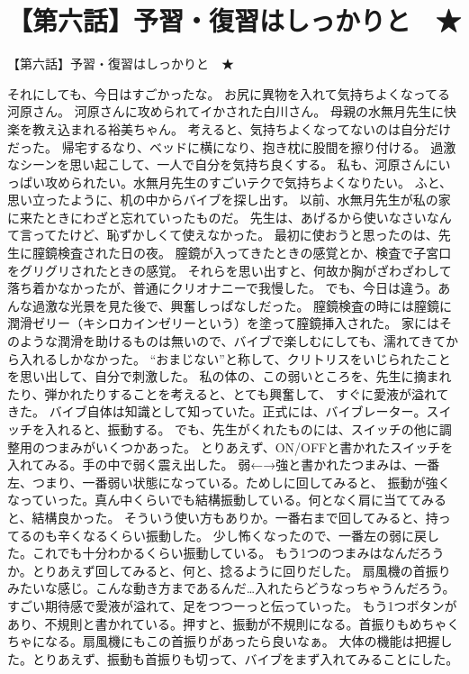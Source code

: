 \section{【第六話】予習・復習はしっかりと　★}
【第六話】予習・復習はしっかりと　★


それにしても、今日はすごかったな。
お尻に異物を入れて気持ちよくなってる河原さん。
河原さんに攻められてイかされた白川さん。
母親の水無月先生に快楽を教え込まれる裕美ちゃん。
考えると、気持ちよくなってないのは自分だけだった。
帰宅するなり、ベッドに横になり、抱き枕に股間を擦り付ける。
過激なシーンを思い起こして、一人で自分を気持ち良くする。
私も、河原さんにいっぱい攻められたい。水無月先生のすごいテクで気持ちよくなりたい。
ふと、思い立ったように、机の中からバイブを探し出す。
以前、水無月先生が私の家に来たときにわざと忘れていったものだ。
先生は、あげるから使いなさいなんて言ってたけど、恥ずかしくて使えなかった。
最初に使おうと思ったのは、先生に膣鏡検査された日の夜。
膣鏡が入ってきたときの感覚とか、検査で子宮口をグリグリされたときの感覚。
それらを思い出すと、何故か胸がざわざわして落ち着かなかったが、普通にクリオナニーで我慢した。
でも、今日は違う。あんな過激な光景を見た後で、興奮しっぱなしだった。
膣鏡検査の時には膣鏡に潤滑ゼリー（キシロカインゼリーという）を塗って膣鏡挿入された。
家にはそのような潤滑を助けるものは無いので、バイブで楽しむにしても、濡れてきてから入れるしかなかった。
“おまじない”と称して、クリトリスをいじられたことを思い出して、自分で刺激した。
私の体の、この弱いところを、先生に摘まれたり、弾かれたりすることを考えると、とても興奮して、
すぐに愛液が溢れてきた。
バイブ自体は知識として知っていた。正式には、バイブレーター。スイッチを入れると、振動する。
でも、先生がくれたものには、スイッチの他に調整用のつまみがいくつかあった。
とりあえず、ON/OFFと書かれたスイッチを入れてみる。手の中で弱く震え出した。
弱←→強と書かれたつまみは、一番左、つまり、一番弱い状態になっている。ためしに回してみると、
振動が強くなっていった。真ん中くらいでも結構振動している。何となく肩に当ててみると、結構良かった。
そういう使い方もありか。一番右まで回してみると、持ってるのも辛くなるくらい振動した。
少し怖くなったので、一番左の弱に戻した。これでも十分わかるくらい振動している。
もう1つのつまみはなんだろうか。とりあえず回してみると、何と、捻るように回りだした。
扇風機の首振りみたいな感じ。こんな動き方まであるんだ…入れたらどうなっちゃうんだろう。
すごい期待感で愛液が溢れて、足をつつーっと伝っていった。
もう1つボタンがあり、不規則と書かれている。押すと、振動が不規則になる。首振りもめちゃくちゃになる。扇風機にもこの首振りがあったら良いなぁ。
大体の機能は把握した。とりあえず、振動も首振りも切って、バイブをまず入れてみることにした。
